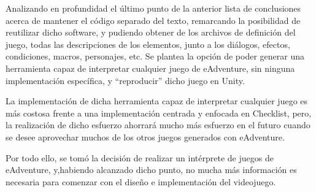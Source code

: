 Analizando en profundidad el último punto de la anterior lista de conclusiones acerca de mantener el código separado del texto, remarcando la posibilidad de reutilizar dicho software, y pudiendo obtener de los archivos de definición del juego, todas las descripciones de los elementos, junto a los diálogos, efectos, condiciones, macros, personajes, etc. Se plantea la opción de poder generar una herramienta capaz de interpretar cualquier juego de eAdventure, sin ninguna implementación específica, y “reproducir” dicho juego en Unity. 

La implementación de dicha herramienta capaz de interpretar cualquier juego es más costosa frente a una implementación centrada y enfocada en Checklist, pero, la realización de dicho esfuerzo ahorrará mucho más esfuerzo en el futuro cuando se desee aprovechar muchos de los otros juegos generados con eAdventure. 

Por todo ello, se tomó la decisión de realizar un intérprete de juegos de eAdventure, y,habiendo alcanzado dicho punto, no mucha más información es necesaria para comenzar con el diseño e implementación del videojuego. 

%

